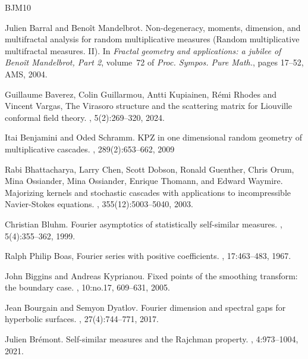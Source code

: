 \documentclass[12pt]{amsart}
\theoremstyle{definition}
\theoremstyle{remark}
\numberwithin{equation}{section}
\begin{document}
\begin{thebibliography}{BJM10}
	
	Julien Barral and Beno\^{i}t Mandelbrot.
	\newblock Non-degeneracy, moments, dimension, and multifractal analysis for
	random multiplicative measures ({R}andom multiplicative multifractal
	measures. {II}).
	\newblock In {\em Fractal geometry and applications: a jubilee of {B}eno\^{i}t
		{M}andelbrot, {P}art 2}, volume~72 of {\em Proc. Sympos. Pure Math.}, pages
	17--52, AMS, 2004.
	
	Guillaume Baverez, Colin Guillarmou, Antti Kupiainen, Rémi Rhodes and Vincent Vargas, 
	\newblock The
	Virasoro structure and the scattering matrix for Liouville conformal field theory. 
	, 5(2):269–320, 2024.
	
	\newblock Itai Benjamini and  Oded Schramm. 
	\newblock KPZ in one dimensional random geometry of multiplicative cascades. 
	, 289(2):653–662, 2009
	
	
	
	
	
	
	
	
	
	Rabi Bhattacharya, Larry Chen, Scott Dobson, Ronald Guenther, Chris Orum, Mina Ossiander,
	Mina Ossiander, Enrique Thomann, and Edward Waymire.
	\newblock Majorizing kernels and stochastic cascades with applications to
	incompressible {N}avier-{S}tokes equations.
	, 355(12):5003--5040, 2003.
	
	Christian Bluhm.
	\newblock Fourier asymptotics of statistically self-similar measures.
	, 5(4):355--362, 1999.
	
	Ralph Philip Boas,
	\newblock Fourier series with positive coefficients.
	, 17:463--483, 1967.
	
	
	
	John Biggins and Andreas Kyprianou.
	\newblock Fixed points of the smoothing transform: the boundary case.
	, 10:no.17, 609--631, 2005.
	
	Jean Bourgain and Semyon Dyatlov.
	\newblock Fourier dimension and spectral gaps for hyperbolic surfaces.
	, 27(4):744--771, 2017.
	
	Julien Br\'{e}mont.
	\newblock Self-similar measures and the {R}ajchman property.
	, 4:973--1004, 2021.
	

\end{thebibliography}
\end{document}
